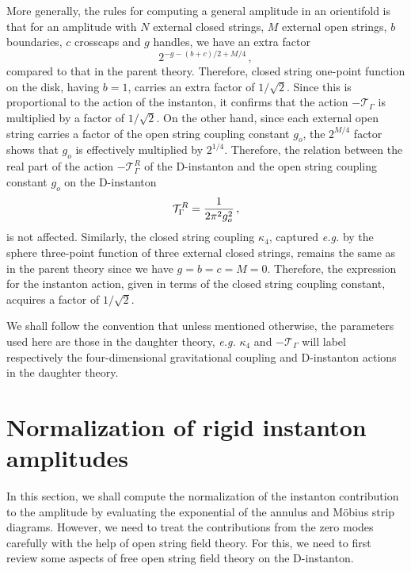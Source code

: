 \documentclass[12pt,a4paper]{article}
\newcommand{\be}{\begin{equation}}
\newcommand{\ee}{\end{equation}}
\newcommand{\cT}{\mathcal{T}}
\begin{document}
More generally, the rules for computing a general amplitude in an orientifold is that for an
amplitude with $N$ external closed strings, $M$ external open strings, $b$ boundaries,
$c$ crosscaps and $g$ handles, we have an extra factor \cite{FarooghMoosavian:2019yke}
\be
2^{-g - (b+c)/2 + M/4}\, ,
\ee
compared to that in the parent theory. Therefore, closed string one-point function on the disk,
having $b=1$, carries an extra factor of $1/\sqrt 2$. Since this is proportional to
the action of the instanton, it confirms that the action $-\cT_\Gamma$
is multiplied by a factor of $1/\sqrt 2$.
On the other hand, since each external open string carries a factor of the open string
coupling constant $g_o$, the $2^{M/4}$
factor shows that $g_o$ is effectively multiplied by $2^{1/4}$. Therefore, the relation
between the real part of the action $-\cT_\Gamma^R$ of the D-instanton and the open string
coupling constant $g_o$ on the D-instanton~\cite{Sen:1999xm}
\be \label{etgo}
\cT_\Gamma^R = {1\over 2\pi^2 g_o^2}\, ,
\ee
is not affected. Similarly, the closed string coupling $\kappa_4$, captured {\it e.g.} by
the sphere three-point function of three external closed strings, remains the same as in the
parent theory since we have $g=b=c=M=0$. Therefore, the expression for the instanton action,
given in terms of the closed string coupling constant, acquires a factor of $1/\sqrt 2$.



 We shall
follow the convention that unless mentioned otherwise, the parameters used here are those
in the daughter theory, {\it e.g.} $\kappa_4$ and $-\cT_\Gamma$ will label
respectively the four-dimensional gravitational coupling and
D-instanton actions in the daughter theory.




\section{Normalization of rigid instanton amplitudes} \label{s1}

In this section, we shall compute the normalization of the instanton contribution to the
amplitude by evaluating
the exponential of the annulus and M\"{o}bius strip diagrams. However, we need to treat the
contributions from the zero modes carefully with the help of open string field theory.
For this, we need to first review
some aspects of free open string field theory on the D-instanton.
\end{document}
